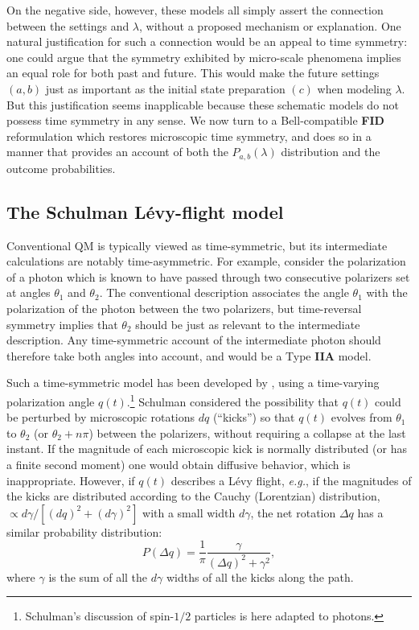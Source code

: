 \documentclass[onecolumn, nofootinbib, 12pt]{revtex4-1}
\begin{document}
On the negative side, however, these models all simply assert the connection between the settings and $\lambda$, without a proposed mechanism or explanation.  One natural justification for such a connection would be an appeal to time symmetry: one could argue that the symmetry exhibited by micro-scale phenomena implies an equal role for both past and future.  This would make the future settings $(a,b)$ just as important as the initial state preparation $(c)$ when modeling $\lambda$.  But this justification seems inapplicable because these schematic models do not possess time symmetry in any sense.  We now turn to a Bell-compatible {\bf FID} reformulation which restores microscopic time symmetry, and does so in a manner that provides an account of both the $P_{a,b}(\lambda)$ distribution and the outcome probabilities.


\subsection{The Schulman L\'evy-flight model}
\label{sec:Schulman}

Conventional QM is typically viewed as time-symmetric, but its intermediate calculations are notably time-asymmetric.  For example, consider the polarization of a photon which is known to have passed through two consecutive polarizers set at angles $\theta_1$ and $\theta_2$.  The conventional description associates the angle $\theta_1$ with the polarization of the photon between the two polarizers, but time-reversal symmetry implies that $\theta_2$ should be just as relevant to the intermediate description.  Any time-symmetric account of the intermediate photon should therefore take both angles into account, and would be a Type {\bf IIA} model.

Such a time-symmetric model has been developed by \textcite{schulman1997,schulman2012}, using a time-varying polarization angle $q(t)$.\footnote{
Schulman's discussion of spin-$1/2$ particles is here adapted to photons.}  
Schulman considered the possibility that $q(t)$ could be perturbed by microscopic rotations $dq$ (``kicks'') so that $q(t)$ evolves from $\theta_1$ to $\theta_2$ (or $\theta_2 + n \pi$) between the polarizers, without requiring a collapse at the last instant.  If the magnitude of each microscopic kick is normally distributed (or has a finite second moment) one would obtain diffusive behavior, which is inappropriate.  However, if $q(t)$ describes a L\'evy flight, \emph{e.g.}, if the magnitudes of the kicks are distributed according to the Cauchy (Lorentzian) distribution, 
$\propto d\gamma / [{(dq)^2+(d\gamma)^2}]$ with a small width $d\gamma$, the net rotation $\Delta q$ has a similar probability distribution:
\begin{equation}
\label{eq:SProb}
P(\Delta q) = \frac{1}{\pi} \frac{\gamma}{(\Delta q)^2+\gamma^2},
\end{equation}
where $\gamma$ is the sum of all the $d\gamma$ widths of all the kicks along the path.
\end{document}
